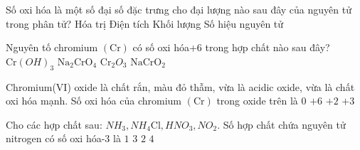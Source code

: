 \begin{ex}Số oxi hóa là một số đại số đặc trưng cho đại lượng nào sau đây của nguyên tử trong phân tử?
	\choice
	{Hóa trị}
	{\True Điện tích}
	{Khối lượng}
	{Số hiệu nguyên tử}
	\loigiai{}
\end{ex}

\begin{ex}[Đề THPT QG-2018]
	Nguyên tố chromium $(\mathrm{Cr})$ có số oxi hóa+6 trong hợp chất nào sau đây?
	\choice
	{$\mathrm{Cr}(OH)_3$}
	{\True $\mathrm{Na}_2\mathrm{CrO}_4$}
	{$\mathrm{Cr}_2O_3$}
	{$\mathrm{NaCrO}_2$}
	\loigiai{}
\end{ex}

\begin{ex}Chromium(VI) oxide là chất rắn, màu đỏ thẫm, vừa là acidic oxide, vừa là chất oxi hóa mạnh. Số oxi hóa của chromium $(\mathrm{Cr})$ trong oxide trên là
	\choice
	{$0$}
	{\True $+6$}
	{$+2$}
	{$+3$}
	\loigiai{}
\end{ex}

\begin{ex}Cho các hợp chất sau: $NH_3, NH_4\mathrm{Cl}, HNO_3, NO_2$. Số hợp chất chứa nguyên tử nitrogen có số oxi hóa-3 là
	\choice
	{$1$}
	{$3$}
	{\True $2$}
	{$4$}
	\loigiai{}
\end{ex}

